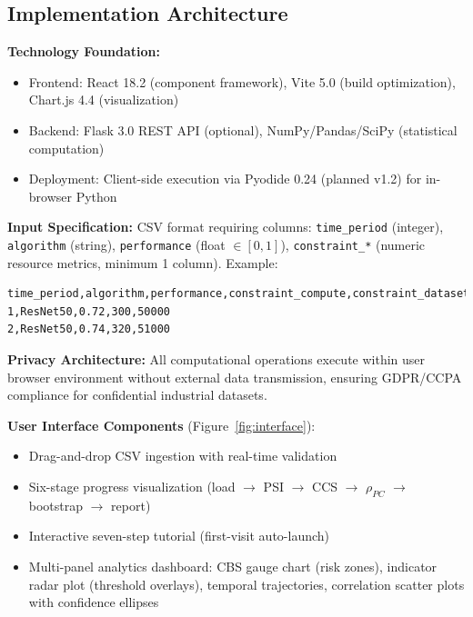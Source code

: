 \documentclass[10pt]{article}
\begin{document}
\subsection{Implementation Architecture}

\textbf{Technology Foundation:}
\begin{itemize}
    \item Frontend: React 18.2 (component framework), Vite 5.0 (build optimization), Chart.js 4.4 (visualization)
    \item Backend: Flask 3.0 REST API (optional), NumPy/Pandas/SciPy (statistical computation)
    \item Deployment: Client-side execution via Pyodide 0.24 (planned v1.2) for in-browser Python
\end{itemize}

\textbf{Input Specification:} CSV format requiring columns: \texttt{time\_period} (integer), \texttt{algorithm} (string), \texttt{performance} (float $\in [0,1]$), \texttt{constraint\_*} (numeric resource metrics, minimum 1 column). Example:
\begin{verbatim}
time_period,algorithm,performance,constraint_compute,constraint_dataset_size
1,ResNet50,0.72,300,50000
2,ResNet50,0.74,320,51000
\end{verbatim}

\textbf{Privacy Architecture:} All computational operations execute within user browser environment without external data transmission, ensuring GDPR/CCPA compliance for confidential industrial datasets.

\textbf{User Interface Components} (Figure~\ref{fig:interface}):
\begin{itemize}
    \item Drag-and-drop CSV ingestion with real-time validation
    \item Six-stage progress visualization (load $\rightarrow$ PSI $\rightarrow$ CCS $\rightarrow$ $\rho_{PC}$ $\rightarrow$ bootstrap $\rightarrow$ report)
    \item Interactive seven-step tutorial (first-visit auto-launch)
    \item Multi-panel analytics dashboard: CBS gauge chart (risk zones), indicator radar plot (threshold overlays), temporal trajectories, correlation scatter plots with confidence ellipses
\end{itemize}
\end{document}
